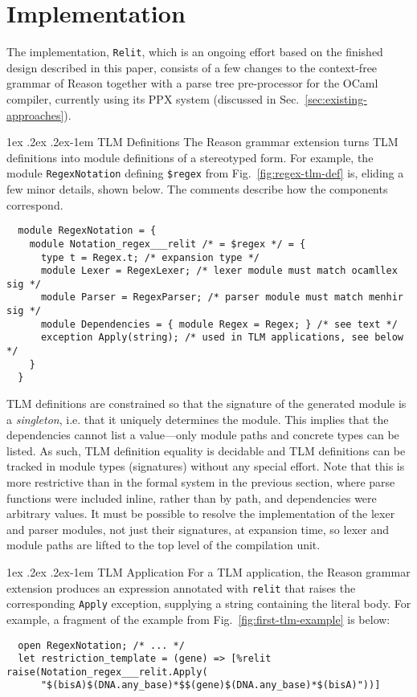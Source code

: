 \documentclass[acmsmall]{acmart}
\makeatletter
\renewcommand{\paragraph}{%
  \@startsection{paragraph}{4}%
  {\z@}{1ex \@plus .2ex \@minus .2ex}{-1em}%
  {\normalfont\normalsize\bfseries}%
}
\newcommand{\li}[1]{\lstinline[basicstyle=\ttfamily\fontsize{9pt}{1em}\selectfont]{#1}}
\makeatother
\begin{document}
\section{Implementation}
\label{sec:implementation}
The implementation, \li{Relit}, which is an ongoing effort based on the finished design described in this paper, consists of a few changes to the context-free grammar of Reason together with a parse tree pre-processor for the OCaml compiler, currently using its PPX system (discussed in Sec.~\ref{sec:existing-approaches}).

\paragraph{TLM Definitions} The Reason grammar extension turns TLM definitions into module definitions of a stereotyped form. For example, the module \li{RegexNotation} defining \li{$regex} from Fig.~\ref{fig:regex-tlm-def} is, eliding a few minor details, shown below. The comments describe how the components correspond. 
\begin{lstlisting}
  module RegexNotation = {
    module Notation_regex___relit /* = $regex */ = { 
      type t = Regex.t; /* expansion type */
      module Lexer = RegexLexer; /* lexer module must match ocamllex sig */
      module Parser = RegexParser; /* parser module must match menhir sig */
      module Dependencies = { module Regex = Regex; } /* see text */
      exception Apply(string); /* used in TLM applications, see below */
    } 
  }
\end{lstlisting}

TLM definitions are constrained so that the signature of the generated module is a \emph{singleton}, i.e. that it uniquely determines the module. This implies that the dependencies cannot list a value---only module paths and concrete types can be listed. As such, TLM definition equality is decidable and TLM definitions can be tracked in module types (signatures) without any special effort. Note that this is more restrictive than in the formal system in the previous section, where parse functions were included inline, rather than by path, and dependencies were arbitrary values. It must be possible to resolve the implementation of the lexer and parser modules, not just their signatures, at expansion time, so lexer and module paths are lifted to the top level of the compilation unit.

\paragraph{TLM Application} For a TLM application, the Reason grammar extension produces an expression annotated with \li{relit} that raises the corresponding \li{Apply} exception, supplying a string containing the literal body. For example, a fragment of the example from Fig.~\ref{fig:first-tlm-example} is below:
\begin{lstlisting}
  open RegexNotation; /* ... */
  let restriction_template = (gene) => [%relit raise(Notation_regex___relit.Apply(
      "$(bisA)$(DNA.any_base)*$$(gene)$(DNA.any_base)*$(bisA)"))]
\end{lstlisting}
\end{document}
